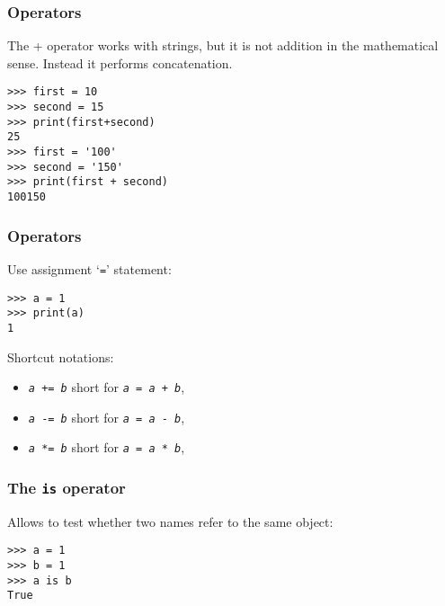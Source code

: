 \begin{frame}[fragile] \frametitle{Operators}
The + operator works with strings, but it is not addition in the mathematical sense. Instead it performs concatenation.
\begin{lstlisting}
>>> first = 10
>>> second = 15
>>> print(first+second)
25
>>> first = '100'
>>> second = '150'
>>> print(first + second)
100150
\end{lstlisting}
\end{frame}

\begin{frame}[fragile] \frametitle{Operators}
Use assignment `\texttt{=}' statement:
\begin{lstlisting}
>>> a = 1
>>> print(a)
1
\end{lstlisting}
Shortcut notations:
  \begin{itemize}
  \item[] \texttt{\emph{a} += \emph{b}} short for \texttt{\emph{a} = \emph{a} + \emph{b}},
  \item[] \texttt{\emph{a} -= \emph{b}} short for \texttt{\emph{a} = \emph{a} - \emph{b}},
  \item[] \texttt{\emph{a} *= \emph{b}} short for \texttt{\emph{a} = \emph{a} * \emph{b}},
   \end{itemize}
\end{frame}


  
  

  

\begin{frame}[fragile]  \frametitle{The \texttt{is} operator}

  Allows to test whether two names refer  to the same object:
\begin{lstlisting}
>>> a = 1
>>> b = 1
>>> a is b
True
\end{lstlisting}

\end{frame}

